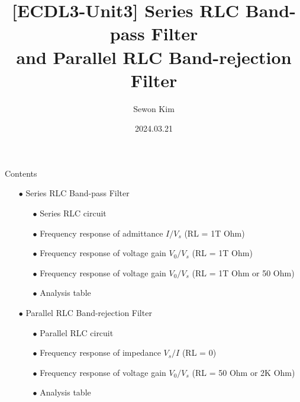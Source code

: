 \documentclass[t, 10pt, handout]{beamer}
\title{[ECDL3-Unit3]
Series RLC Band-pass Filter \\ 
and Parallel RLC Band-rejection Filter}
\author{Sewon Kim}
\institute{\normalsize Department of Electrical and Computer Engineering \\
University of Seoul
	\vspace{1cm}
\\
\vspace{-0.2cm}}
\date{2024.03.21}
\begin{document}
\begin{frame}[plain]
  \titlepage
\end{frame}


\begin{frame}{Contents}
    \begin{itemize}
        \item[$\bullet$] {\large Series RLC Band-pass Filter}
        \vspace{5pt}
        \begin{itemize}
            \item[$\bullet$] {\normalsize Series RLC circuit}
            \vspace{5pt}
            \item[$\bullet$] {\normalsize Frequency response of admittance $I/V_s$ (RL = 1T Ohm)}
            \vspace{5pt}
            \item[$\bullet$] {\normalsize Frequency response of voltage gain $V_0/V_s$ (RL = 1T Ohm)}
            \vspace{5pt}
            \item[$\bullet$] {\normalsize Frequency response of voltage gain $V_0/V_s$ (RL = 1T Ohm or 50 Ohm)}
            \vspace{5pt}
            \item[$\bullet$] {\normalsize Analysis table}
        \end{itemize}
        \vspace{10pt}
        \item[$\bullet$] {\large Parallel RLC Band-rejection Filter}
        \vspace{5pt}
        \begin{itemize}
            \item[$\bullet$] {\normalsize Parallel RLC circuit}
            \vspace{5pt}
            \item[$\bullet$] {\normalsize Frequency response of impedance $V_s/I$ (RL = 0)}
            \vspace{5pt}
            \item[$\bullet$] {\normalsize Frequency response of voltage gain $V_0/V_s$ (RL = 50 Ohm or 2K Ohm)}
            \vspace{5pt}
            \item[$\bullet$] {\normalsize Analysis table}
        \end{itemize}
    \end{itemize}
\end{frame}
\end{document}
